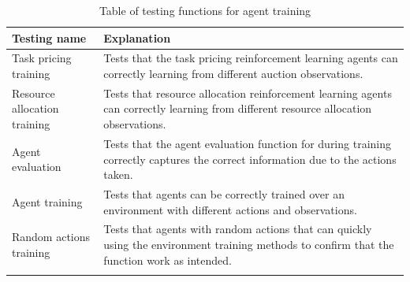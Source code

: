 \begin{longtable}{|p{3cm}|p{11cm}|} \hline
    \textbf{Testing name} & \textbf{Explanation} \\ \hline
    Task pricing training & Tests that the task pricing reinforcement learning agents can correctly learning from
        different auction observations. \\ \hline
    Resource allocation training & Tests that resource allocation reinforcement learning agents can correctly
        learning from different resource allocation observations. \\ \hline
    Agent evaluation & Tests that the agent evaluation function for during training correctly captures the correct
        information due to the actions taken. \\ \hline
    Agent training & Tests that agents can be correctly trained over an environment with different actions and
        observations. \\ \hline
    Random actions training & Tests that agents with random actions that can quickly using the environment training
        methods to confirm that the function work as intended. \\ \hline
    \caption{Table of testing functions for agent training}
    \label{tab:training_testing}
\end{longtable}


